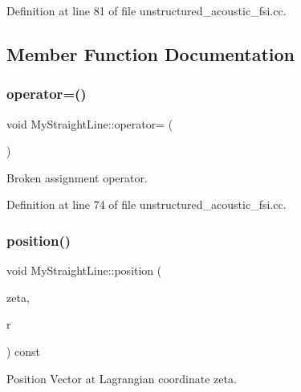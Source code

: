 Definition at line 81 of file unstructured\+\_\+acoustic\+\_\+fsi.\+cc.



\subsection{Member Function Documentation}
\mbox{\label{classMyStraightLine_a926ab921fec52ded94509efce06b66a7}} 
\subsubsection{\texorpdfstring{operator=()}{operator=()}}
{\footnotesize\ttfamily void My\+Straight\+Line\+::operator= (\begin{DoxyParamCaption}\item[{const \hyperlink{classMyStraightLine}{My\+Straight\+Line} \&}]{ }\end{DoxyParamCaption})\hspace{0.3cm}{\ttfamily [inline]}}



Broken assignment operator. 



Definition at line 74 of file unstructured\+\_\+acoustic\+\_\+fsi.\+cc.

\mbox{\label{classMyStraightLine_ae3ee51a7b81acc2ef652bec4ee955d2f}} 
\subsubsection{\texorpdfstring{position()}{position()}}
{\footnotesize\ttfamily void My\+Straight\+Line\+::position (\begin{DoxyParamCaption}\item[{const Vector$<$ double $>$ \&}]{zeta,  }\item[{Vector$<$ double $>$ \&}]{r }\end{DoxyParamCaption}) const\hspace{0.3cm}{\ttfamily [inline]}}



Position Vector at Lagrangian coordinate zeta. 



